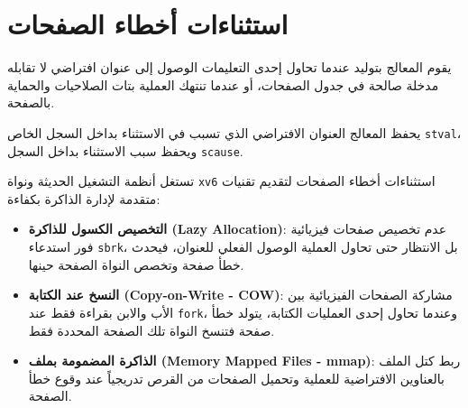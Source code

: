 \chapter{استثناءات أخطاء الصفحات}
\label{chap:pgfault}

يقوم المعالج بتوليد  عندما تحاول إحدى التعليمات الوصول إلى عنوان افتراضي لا تقابله مدخلة صالحة في جدول الصفحات،
أو عندما تنتهك العملية بتات الصلاحيات والحماية بالصفحة.

يحفظ المعالج العنوان الافتراضي الذي تسبب في الاستثناء بداخل السجل الخاص \texttt{stval}،
ويحفظ سبب الاستثناء بداخل السجل \texttt{scause}.

تستغل أنظمة التشغيل الحديثة ونواة \texttt{xv6} استثناءات أخطاء الصفحات لتقديم تقنيات متقدمة لإدارة الذاكرة بكفاءة:
\begin{itemize}
\item \textbf{التخصيص الكسول للذاكرة (Lazy Allocation)}: عدم تخصيص صفحات فيزيائية فور استدعاء \texttt{sbrk}، بل الانتظار حتى تحاول العملية الوصول الفعلي للعنوان، فيحدث خطأ صفحة وتخصص النواة الصفحة حينها.
\item \textbf{النسخ عند الكتابة (Copy-on-Write - COW)}: مشاركة الصفحات الفيزيائية بين الأب والابن بقراءة فقط عند \texttt{fork}، وعندما تحاول إحدى العمليات الكتابة، يتولد خطأ صفحة فتنسخ النواة تلك الصفحة المحددة فقط.
\item \textbf{الذاكرة المضمومة بملف (Memory Mapped Files - mmap)}: ربط كتل الملف بالعناوين الافتراضية للعملية وتحميل الصفحات من القرص تدريجياً عند وقوع خطأ الصفحة.
\end{itemize}
